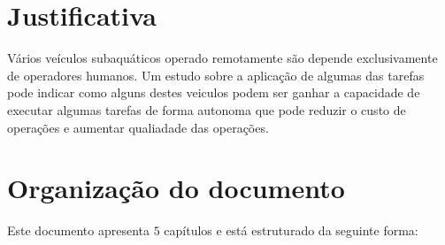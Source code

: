 %
%
%
%
%
%


\section{Justificativa}
\label{sec:justi}

Vários veículos subaquáticos operado remotamente são depende exclusivamente de operadores humanos. Um estudo sobre a aplicação de algumas das tarefas pode indicar como alguns destes veiculos podem ser ganhar a capacidade de executar algumas tarefas de forma autonoma que pode reduzir o custo de operações e aumentar qualiadade das operações.




\section{Organização do documento}
\label{section:organizacao}

Este documento apresenta $5$ capítulos e está estruturado da seguinte forma:

